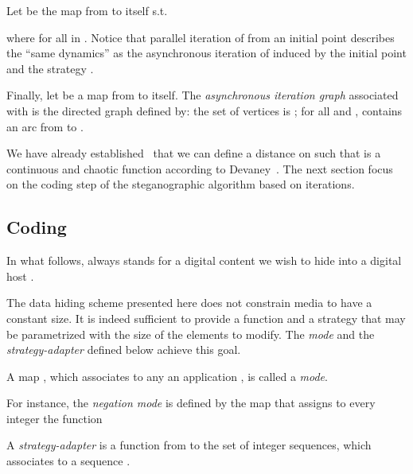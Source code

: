 \documentclass{comjnl}
\begin{document}
Let  be the map from  to 
itself s.t.
 
where  for all  in . 
Notice that parallel iteration of  from an initial point
 describes the ``same dynamics'' as the asynchronous
iteration of  induced by the initial point  and the strategy
.


Finally, let  be a map from  to itself. The
{\emph{asynchronous iteration graph}} associated with  is the
directed graph  defined by: the set of vertices is
; for all  and ,
 contains an arc from  to . 























We have already established~\cite{GuyeuxThese10} that we can define a
distance  on  such that 
 is a continuous and chaotic function according to 
Devaney~\cite{Devaney}.
The next section focus on  the coding step of  the steganographic algorithm
based on  iterations. 

\subsection{Coding}\label{sub:wmcoding}
In what follows,  always stands  
for a digital content we wish to hide into a digital host .


The data hiding scheme presented here does not constrain media to have 
a constant size. It is indeed sufficient to provide a function and a strategy 
that may be  parametrized with the size of the elements to modify. 
The \emph{mode} and the \emph{strategy-adapter} defined below achieve 
this goal.  

\begin{definition}[Mode]
\label{def:mode}
A map , which associates to any  an application 
, is called a \emph{mode}.
\end{definition}






For instance, the \emph{negation mode} is defined by the map that
assigns to every integer  the function 




\begin{definition}
  \label{def:strategy-adapter}
  A \emph{strategy-adapter} is a function  
  from  to the set of integer sequences, 
  which associates to  a sequence 
  .
\end{definition}
\end{document}
